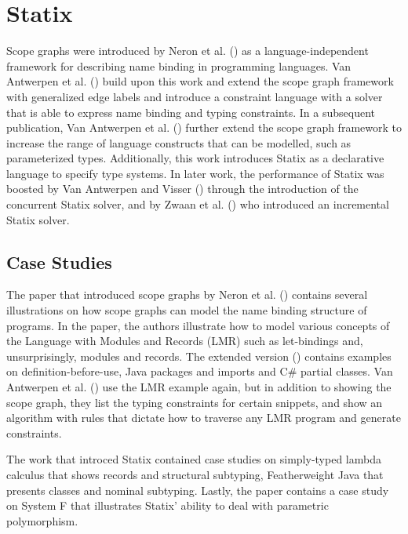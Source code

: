   \section{Statix}

    Scope graphs were introduced by Neron et al. (\citeyear{Neron2015}) as a language-independent framework for describing name binding in programming languages. Van Antwerpen et al. (\citeyear{AntwerpenNTVW16}) build upon this work and extend the scope graph framework with generalized edge labels and introduce a constraint language with a solver that is able to express name binding and typing constraints. In a subsequent publication, Van Antwerpen et al. (\citeyear{VanAntwerpen2018}) further extend the scope graph framework to increase the range of language constructs that can be modelled, such as parameterized types. Additionally, this work introduces Statix as a declarative language to specify type systems. In later work, the performance of Statix was boosted by Van Antwerpen and Visser (\citeyear{AntwerpenV21}) through the introduction of the concurrent Statix solver, and by Zwaan et al. (\citeyear{ZwaanAV22}) who introduced an incremental Statix solver.

    \subsection{Case Studies}

      The paper that introduced scope graphs by Neron et al. (\citeyear{Neron2015}) contains several illustrations on how scope graphs can model the name binding structure of programs. In the paper, the authors illustrate how to model various concepts of the Language with Modules and Records (LMR) such as let-bindings and, unsurprisingly, modules and records. The extended version (\citeyear{TUD-SERG-2015-001}) contains examples on definition-before-use, Java packages and imports and C\# partial classes. Van Antwerpen et al. (\citeyear{AntwerpenNTVW16}) use the LMR example again, but in addition to showing the scope graph, they list the typing constraints for certain snippets, and show an algorithm with rules that dictate how to traverse any LMR program and generate constraints.

      The work that introced Statix \autocite{VanAntwerpen2018} contained case studies on simply-typed lambda calculus that shows records and structural subtyping, Featherweight Java that presents classes and nominal subtyping. Lastly, the paper contains a case study on System F that illustrates Statix' ability to deal with parametric polymorphism.

